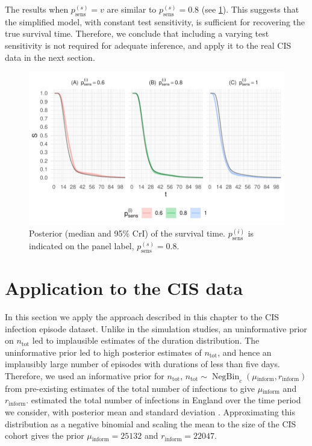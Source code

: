 \documentclass[12pt]{article}
\DeclareMathOperator{\NBr}{NegBin}
\newcommand{\NBc}{\NBr_{c}}
\newcommand\citePersonalComms[1]{(#1, personal communication)}
\newcommand{\psenss}{p_\text{sens}^{(s)}}
\newcommand{\psensi}{p_\text{sens}^{(i)}}
\newcommand{\ntot}{n_\text{tot}}
\newcommand{\inform}{{_{\text{inform}}}}
\begin{document}
The results when $\psenss = v$ are similar to $\psenss = 0.8$ (see \cref{imperf-test:fig:variable-test-sensitivity}).
This suggests that the simplified model, with constant test sensitivity, is sufficient for recovering the true survival time.
Therefore, we conclude that including a varying test sensitivity is not required for adequate inference, and apply it to the real CIS data in the next section.
\begin{figure}
  \includegraphics[width=\textwidth]{figures/output/sim-variable-sensitivity}
  \caption[Simulation study results with varying test sensitivity]{%
    Posterior (median and 95\% CrI) of the survival time.
    $\psensi$ is indicated on the panel label, $\psenss = 0.8$.
  }
  \label{imperf-test:fig:variable-test-sensitivity}
\end{figure}

\section{Application to the CIS data} \label{sec:CIS}

In this section we apply the approach described in this chapter to the CIS infection episode dataset.
Unlike in the simulation studies, an uninformative prior on $\ntot$ led to implausible estimates of the duration distribution.
The uninformative prior led to high posterior estimates of $\ntot$, and hence an implausibly large number of episodes with durations of less than five days.
Therefore, we used an informative prior for $\ntot$, $\ntot \sim \NBc(\mu\inform, r\inform)$ from pre-existing estimates of the total number of infections to give $\mu\inform$ and $r\inform$.
\citet{birrellRTM2} estimated the total number of infections in England over the time period we consider, with posterior mean  and standard deviation .
Approximating this distribution as a negative binomial and scaling the mean to the size of the CIS cohort gives the prior $\mu\inform = 25132$ and $r\inform = 22047$.
\end{document}
